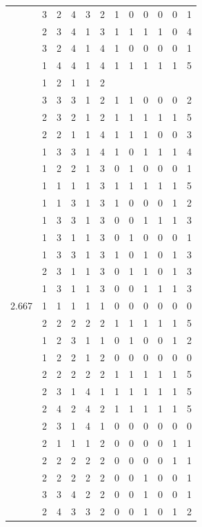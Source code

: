 \documentclass[]{msu-thesis}
\theoremstyle{definition}
\theoremstyle{definition}
\theoremstyle{definition}
\theoremstyle{remark}
\begin{document}
\begin{table}
{\begin{tabular}[t]{rrrrrrrrrrrr}
 & 3 & 2 & 4 & 3 & 2 & 1 & 0 & 0 & 0 & 0 & 1\\
 & 2 & 3 & 4 & 1 & 3 & 1 & 1 & 1 & 1 & 0 & 4\\
 & 3 & 2 & 4 & 1 & 4 & 1 & 0 & 0 & 0 & 0 & 1\\
 & 1 & 4 & 4 & 1 & 4 & 1 & 1 & 1 & 1 & 1 & 5\\
 & 1 & 2 & 1 & 1 & 2 &  &  &  &  &  & \\
 & 3 & 3 & 3 & 1 & 2 & 1 & 1 & 0 & 0 & 0 & 2\\
 & 2 & 3 & 2 & 1 & 2 & 1 & 1 & 1 & 1 & 1 & 5\\
 & 2 & 2 & 1 & 1 & 4 & 1 & 1 & 1 & 0 & 0 & 3\\
 & 1 & 3 & 3 & 1 & 4 & 1 & 0 & 1 & 1 & 1 & 4\\
 & 1 & 2 & 2 & 1 & 3 & 0 & 1 & 0 & 0 & 0 & 1\\
 & 1 & 1 & 1 & 1 & 3 & 1 & 1 & 1 & 1 & 1 & 5\\
 & 1 & 1 & 3 & 1 & 3 & 1 & 0 & 0 & 0 & 1 & 2\\
 & 1 & 3 & 3 & 1 & 3 & 0 & 0 & 1 & 1 & 1 & 3\\
 & 1 & 3 & 1 & 1 & 3 & 0 & 1 & 0 & 0 & 0 & 1\\
 & 1 & 3 & 3 & 1 & 3 & 1 & 0 & 1 & 0 & 1 & 3\\
 & 2 & 3 & 1 & 1 & 3 & 0 & 1 & 1 & 0 & 1 & 3\\
 & 1 & 3 & 1 & 1 & 3 & 0 & 0 & 1 & 1 & 1 & 3\\
2.667 & 1 & 1 & 1 & 1 & 1 & 0 & 0 & 0 & 0 & 0 & 0\\
 & 2 & 2 & 2 & 2 & 2 & 1 & 1 & 1 & 1 & 1 & 5\\
 & 1 & 2 & 3 & 1 & 1 & 0 & 1 & 0 & 0 & 1 & 2\\
 & 1 & 2 & 2 & 1 & 2 & 0 & 0 & 0 & 0 & 0 & 0\\
 & 2 & 2 & 2 & 2 & 2 & 1 & 1 & 1 & 1 & 1 & 5\\
 & 2 & 3 & 1 & 4 & 1 & 1 & 1 & 1 & 1 & 1 & 5\\
 & 2 & 4 & 2 & 4 & 2 & 1 & 1 & 1 & 1 & 1 & 5\\
 & 2 & 3 & 1 & 4 & 1 & 0 & 0 & 0 & 0 & 0 & 0\\
 & 2 & 1 & 1 & 1 & 2 & 0 & 0 & 0 & 0 & 1 & 1\\
 & 2 & 2 & 2 & 2 & 2 & 0 & 0 & 0 & 0 & 1 & 1\\
 & 2 & 2 & 2 & 2 & 2 & 0 & 0 & 1 & 0 & 0 & 1\\
 & 3 & 3 & 4 & 2 & 2 & 0 & 0 & 1 & 0 & 0 & 1\\
 & 2 & 4 & 3 & 3 & 2 & 0 & 0 & 1 & 0 & 1 & 2\\

\end{tabular}}
\end{table}
\end{document}
